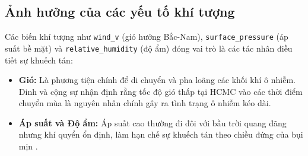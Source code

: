 \subsection{Ảnh hưởng của các yếu tố khí tượng}

Các biến khí tượng như \texttt{wind\_v} (gió hướng Bắc-Nam), \texttt{surface\_pressure} (áp suất bề mặt) và \texttt{relative\_humidity} (độ ẩm) đóng vai trò là các tác nhân điều tiết sự khuếch tán:
\begin{itemize}
    \item \textbf{Gió:} Là phương tiện chính để di chuyển và pha loãng các khối khí ô nhiễm. Dinh và cộng sự \cite{Dinh2020} nhận định rằng tốc độ gió thấp tại HCMC vào các thời điểm chuyển mùa là nguyên nhân chính gây ra tình trạng ô nhiễm kéo dài.
    \item \textbf{Áp suất và Độ ẩm:} Áp suất cao thường đi đôi với bầu trời quang đãng nhưng khí quyển ổn định, làm hạn chế sự khuếch tán theo chiều đứng của bụi mịn \cite{Jacob2009, Bui2023}.
\end{itemize}